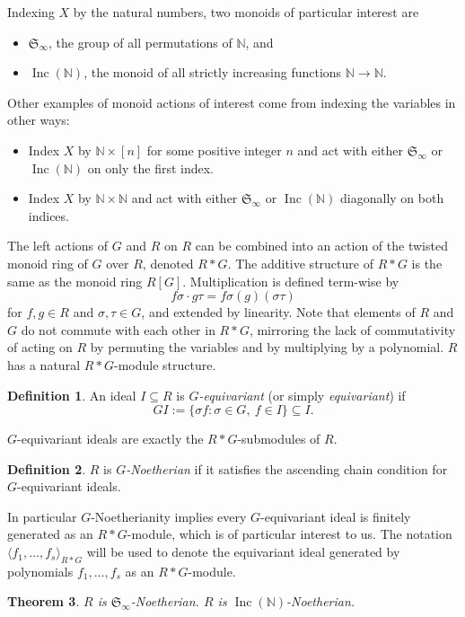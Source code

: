 \documentclass[10pt]{amsart}
\newtheorem{theorem}{Theorem}[section]
\theoremstyle{definition}
\newtheorem{definition}[theorem]{Definition}
\theoremstyle{remark}
\numberwithin{equation}{section}
\newcommand{\B}[1]{\mathbb #1}
\newcommand{\F}[1]{\mathfrak #1}
\newcommand{\<}{\langle}
\renewcommand{\>}{\rangle}
\newcommand{\ideal}[1]{\langle #1 \rangle}
\newcommand{\Inc}{\operatorname{Inc}(\B N)}
\begin{document}
Indexing $X$ by the natural numbers, two monoids of particular interest are
\begin{itemize}
 \item ${\mathfrak S}_{\infty}$, the group of all permutations of $\B N$, and
 \item $\Inc$, the monoid of all strictly increasing functions $\B N \to \B N$.
\end{itemize}
Other examples of monoid actions of interest come from indexing the variables in other ways:
\begin{itemize}
 \item Index $X$ by $\B N \times [n]$ for some positive integer $n$ and act with either $\F S_\infty$ or $\Inc$ on only the first index.
 \item Index $X$ by $\B N \times \B N$ and act with either $\F S_\infty$ or $\Inc$ diagonally on both indices.
\end{itemize}


The left actions of $G$ and $R$ on $R$ can be combined into an action of the twisted monoid ring of $G$ over $R$, denoted $R*G$.  The additive structure of $R*G$ is the same as the monoid ring $R[G]$.  Multiplication is defined term-wise by
 \[ f\sigma\cdot g\tau = f\sigma(g)(\sigma\tau) \]
for $f,g\in R$ and $\sigma,\tau\in G$, and extended by linearity.  Note that elements of $R$ and $G$ do not commute with each other in $R*G$, mirroring the lack of commutativity of acting on $R$ by permuting the variables and by multiplying by a polynomial.  $R$ has a natural $R*G$-module structure.

\begin{definition}
 An ideal $I \subseteq R$ is $G$\textit{-equivariant}
(or simply \textit{equivariant}) if \[ GI := \{\sigma f
: \sigma \in G, \ f \in I\} \subseteq I.\]
\end{definition}
$G$-equivariant ideals are exactly the $R*G$-submodules of $R$.

\begin{definition}
$R$ is $G${\em -Noetherian} if it satisfies the ascending chain condition for $G$-equivariant ideals.
\end{definition}
In particular $G$-Noetherianity implies every $G$-equivariant ideal is finitely generated as an $R*G$-module, which is of particular interest to us.  The notation $\ideal{f_1,\ldots,f_s}_{R*G}$ will be used to denote the equivariant ideal generated by polynomials $f_1,\ldots,f_s$ as an $R*G$-module.

\begin{theorem}\label{onevarfinitegenthm}
$R$ is $\F S_\infty$-Noetherian.  $R$ is $\Inc$-Noetherian.
\end{theorem}
\end{document}
